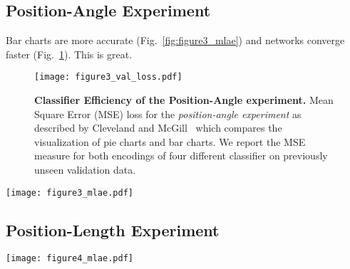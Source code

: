 \subsection{Position-Angle Experiment}

Bar charts are more accurate (Fig.~\ref{fig:figure3_mlae}) and networks converge faster (Fig.~\ref{fig:figure3_val_loss}). This is great.

\begin{figure}[t]
	  \texttt{[image: figure3\_val\_loss.pdf]}
  \caption{\textbf{Classifier Efficiency of the Position-Angle experiment.} Mean Square Error (MSE) loss for the \emph{position-angle experiment} as described by Cleveland and McGill~\cite{cleveland_mcgill} which compares the visualization of pie charts and bar charts. We report the MSE measure for both encodings of four different classifier on previously unseen validation data.}
	\label{fig:figure3_val_loss}
\end{figure}

\begin{figure*}[t]
	  \texttt{[image: figure3\_mlae.pdf]}
  \caption{\textbf{Computational results of the Position-Angle experiment.} Log absolute error means and 95\% confidence intervals for the \emph{position-angle experiment} as described by Cleveland and McGill~\cite{cleveland_mcgill}. We test the performance of a Multi-layer Perceptron (MLP), the LeNet Convolutional Neural Network, as well as feature generation using the VGG19 and Xception networks trained on ImageNet.}
	\label{fig:figure3_mlae}
\end{figure*}

\subsection{Position-Length Experiment}

\begin{figure*}[t]
	  \texttt{[image: figure4\_mlae.pdf]}
  \caption{\textbf{Computational results of the Position-Length experiment.} Log absolute error means and 95\% confidence intervals for the \emph{position-length experiment} as described by Cleveland and McGill~\cite{cleveland_mcgill}. We test the performance of a Multi-layer Perceptron (MLP), the LeNet Convolutional Neural Network, as well as feature generation using the VGG19 and Xception networks trained on ImageNet.}
	\label{fig:figure4_mlae}
\end{figure*}

